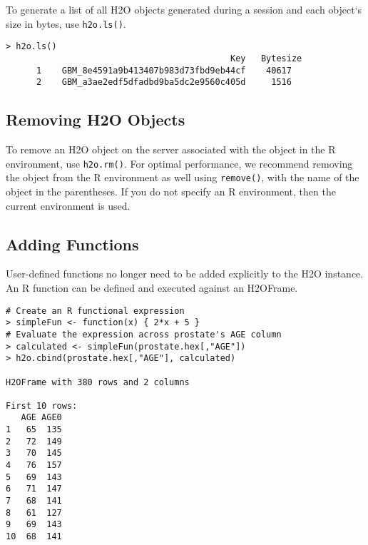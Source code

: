 {{To generate a list of all H2O objects generated during a session and each object`s size in bytes, use {\texttt{h2o.ls()}}.

\waterExampleInR
\medskip
\footnotesize
\begin{lstlisting}[style=R]
> h2o.ls()
                                            Key   Bytesize
      1    GBM_8e4591a9b413407b983d73fbd9eb44cf    40617
      2    GBM_a3ae2edf5dfadbd9ba5dc2e9560c405d     1516
\end{lstlisting}

\normalsize 

\subsection{Removing H2O Objects}


To remove an H2O object on the server associated with the object in the R environment, use {\texttt{h2o.rm()}}. For optimal performance, we recommend removing the object from the R environment as well using {\texttt{remove()}}, with the name of the object in the parentheses. If you do not specify an R environment, then the current environment is used.

\waterExampleInR
\medskip


\subsection{Adding Functions}


User-defined functions no longer need to be added explicitly to the H2O instance. An R function can be defined and executed against an H2OFrame.

\waterExampleInR
\medskip
\begin{lstlisting}[style=R]
# Create an R functional expression
> simpleFun <- function(x) { 2*x + 5 }
# Evaluate the expression across prostate's AGE column
> calculated <- simpleFun(prostate.hex[,"AGE"])
> h2o.cbind(prostate.hex[,"AGE"], calculated)

H2OFrame with 380 rows and 2 columns

First 10 rows:
   AGE AGE0
1   65  135
2   72  149
3   70  145
4   76  157
5   69  143
6   71  147
7   68  141
8   61  127
9   69  143
10  68  141
\end{lstlisting}

}}
